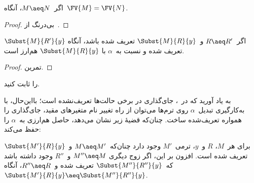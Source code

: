 \documentclass[../../../include/open-logic-section]{subfiles}
\begin{document}
\begin{thm}
  اگر~$M \aeq N$، آنگاه~$\FV{M} = \FV{N}$.
\end{thm}

\begin{proof}
  بی‌درنگ از~.
\end{proof}

\begin{lem}
  اگر~$R \aeq R'$ و~$\Subst{M}{R}{y}$ تعریف شده باشد، آنگاه
  $\Subst{M}{R'}{y}$ تعریف شده و نسبت به~$\alpha$ با
  $\Subst{M}{R}{y}$ هم‌ارز است.
\end{lem}

\begin{proof}
  تمرین.
\end{proof}

\begin{prob}
   را ثابت کنید.
\end{prob}

به یاد آورید که در~، جای‌گذاری در برخی حالت‌ها تعریف‌نشده
است؛ بااین‌حال، با به‌کارگیری تبدیل~$\alpha$ روی ترم‌ها می‌توان از راه
تغییر نام متغیرهای مقید، جای‌گذاری را همواره تعریف‌شده ساخت. چنان‌که
قضیهٔ زیر نشان می‌دهد، حاصل هم‌ارزی به~$\alpha$ را حفظ می‌کند:

\begin{thm}
  برای هر~$M$، $R$ و~$y$، ترمی~$M'$ وجود دارد چنان‌که~$M \aeq M'$
  و~$\Subst{M'}{R}{y}$ تعریف شده است. افزون بر این، اگر زوج دیگری
  $M'' \aeq M$ و~$R''$ وجود داشته باشد که~$\Subst{M''}{R''}{y}$ تعریف
  شده و~$R'' \aeq R$، آنگاه
  $\Subst{M'}{R}{y} \aeq \Subst{M''}{R''}{y}$.
\end{thm}
\end{document}
